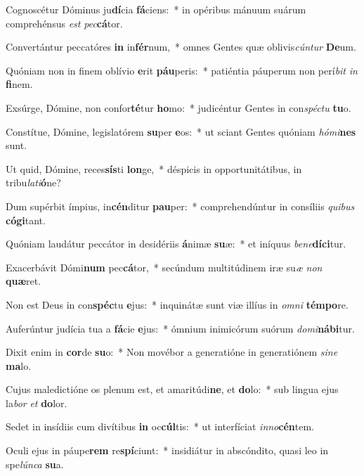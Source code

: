 \item Cognoscétur Dóminus ju\textbf{dí}cia \textbf{fá}ciens:~* in opéribus mánuum suárum comprehénsus \textit{est} \textit{pec}\textbf{cá}tor.
\item Convertántur peccatóres \textbf{in} in\textbf{fér}num,~* omnes Gentes quæ oblivis\textit{cún}\textit{tur} \textbf{De}um.
\item Quóniam non in finem oblívio \textbf{e}rit \textbf{páu}peris:~* patiéntia páuperum non perí\textit{bit} \textit{in} \textbf{fi}nem.
\item Exsúrge, Dómine, non confor\textbf{té}tur \textbf{ho}mo:~* judicéntur Gentes in con\textit{spéc}\textit{tu} \textbf{tu}o.
\item Constítue, Dómine, legislatórem \textbf{su}per \textbf{e}os:~* ut sciant Gentes quóniam \textit{hó}\textit{mi}\textbf{nes} sunt.
\item Ut quid, Dómine, reces\textbf{sís}ti \textbf{lon}ge,~* déspicis in opportunitátibus, in tribu\textit{la}\textit{ti}\textbf{ó}ne?
\item Dum supérbit ímpius, in\textbf{cén}ditur \textbf{pau}per:~* comprehendúntur in consíliis \textit{qui}\textit{bus} \textbf{có}\textbf{gi}tant.
\item Quóniam laudátur peccátor in desidériis \textbf{á}nimæ \textbf{su}æ:~* et iníquus \textit{be}\textit{ne}\textbf{dí}\textbf{ci}tur.
\item Exacerbávit Dómi\textbf{num} pec\textbf{cá}tor,~* secúndum multitúdinem iræ su\textit{æ} \textit{non} \textbf{quæ}ret.
\item Non est Deus in con\textbf{spéc}tu \textbf{e}jus:~* inquinátæ sunt viæ illíus in \textit{om}\textit{ni} \textbf{tém}\textbf{po}re.
\item Auferúntur judícia tua a \textbf{fá}cie \textbf{e}jus:~* ómnium inimicórum suórum \textit{do}\textit{mi}\textbf{ná}\textbf{bi}tur.
\item Dixit enim in \textbf{cor}de \textbf{su}o:~* Non movébor a generatióne in generatiónem \textit{si}\textit{ne} \textbf{ma}lo.
\item Cujus maledictióne os plenum est, et amaritúdi\textbf{ne}, et \textbf{do}lo:~* sub lingua ejus la\textit{bor} \textit{et} \textbf{do}lor.
\item Sedet in insídiis cum divítibus \textbf{in} oc\textbf{cúl}tis:~* ut interfíciat \textit{in}\textit{no}\textbf{cén}tem.
\item Oculi ejus in páupe\textbf{rem} re\textbf{spí}ciunt:~* insidiátur in abscóndito, quasi leo in spe\textit{lún}\textit{ca} \textbf{su}a.
